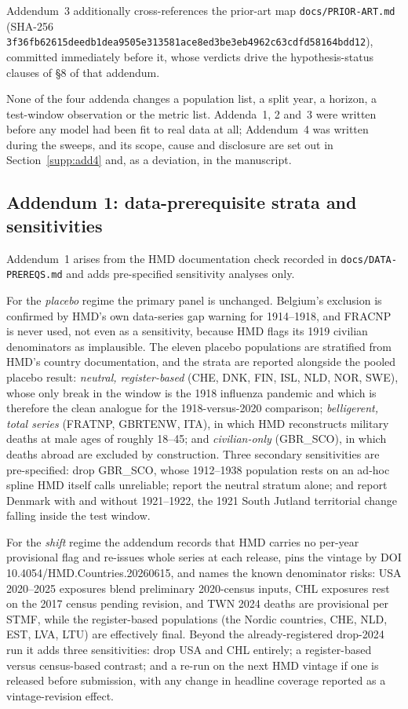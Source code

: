 Addendum~3 additionally cross-references the prior-art map
\texttt{docs/PRIOR-ART.md} (SHA-256
\texttt{\small 3f36fb62615deedb1dea9505e313581ace8ed3be3eb4962c63cdfd58164bdd12}),
committed immediately before it, whose verdicts drive the hypothesis-status
clauses of \S8 of that addendum.

None of the four addenda changes a population list, a split year, a horizon, a
test-window observation or the metric list. Addenda~1, 2 and~3 were written
before any model had been fit to real data at all; Addendum~4 was written
during the sweeps, and its scope, cause and disclosure are set out in
Section~\ref{supp:add4} and, as a deviation, in the manuscript.

\subsection{Addendum 1: data-prerequisite strata and sensitivities}
\label{supp:add1}

Addendum~1 arises from the HMD documentation check recorded in
\texttt{docs/DATA-PREREQS.md} and adds pre-specified sensitivity analyses
only.

For the \emph{placebo} regime the primary panel is unchanged. Belgium's
exclusion is confirmed by HMD's own data-series gap warning for 1914--1918,
and FRACNP is never used, not even as a sensitivity, because HMD flags its
1919 civilian denominators as implausible. The eleven placebo populations are
stratified from HMD's country documentation, and the strata are reported
alongside the pooled placebo result: \emph{neutral, register-based} (CHE, DNK,
FIN, ISL, NLD, NOR, SWE), whose only break in the window is the 1918
influenza pandemic and which is therefore the clean analogue for the
1918-versus-2020 comparison; \emph{belligerent, total series} (FRATNP,
GBRTENW, ITA), in which HMD reconstructs military deaths at male ages of
roughly 18--45; and \emph{civilian-only} (GBR\_SCO), in which deaths abroad
are excluded by construction. Three secondary sensitivities are pre-specified:
drop GBR\_SCO, whose 1912--1938 population rests on an ad-hoc spline HMD
itself calls unreliable; report the neutral stratum alone; and report Denmark
with and without 1921--1922, the 1921 South Jutland territorial change falling
inside the test window.

For the \emph{shift} regime the addendum records that HMD carries no per-year
provisional flag and re-issues whole series at each release, pins the vintage
by DOI 10.4054/HMD.Countries.20260615, and names the known denominator risks:
USA 2020--2025 exposures blend preliminary 2020-census inputs, CHL exposures
rest on the 2017 census pending revision, and TWN 2024 deaths are provisional
per STMF, while the register-based populations (the Nordic countries, CHE,
NLD, EST, LVA, LTU) are effectively final. Beyond the already-registered
drop-2024 run it adds three sensitivities: drop USA and CHL entirely; a
register-based versus census-based contrast; and a re-run on the next HMD
vintage if one is released before submission, with any change in headline
coverage reported as a vintage-revision effect.

